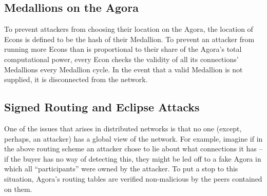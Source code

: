 \subsection{Medallions on the Agora}

To prevent attackers from choosing their location on the Agora, the
location of Econs is defined to be the hash of their Medallion.  To
prevent an attacker from running more Econs than is proportional to
their share of the Agora's total computational power, every Econ
checks the validity of all its connections' Medallions every Medallion
cycle. In the event that a valid Medallion is not supplied, it is
disconnected from the network.

\subsection{Signed Routing and Eclipse Attacks}










One of the issues that arises in distributed networks is that no one (except, perhaps, an attacker) has a global view of the network. For example, imagine if in the above routing scheme an attacker chose to lie about what connections it has – if the buyer has no way of detecting this, they might be led off to a fake Agora in which all “participants” were owned by the attacker. To put a stop to this situation, Agora's routing tables are verified non-malicious by the peers contained on them.

